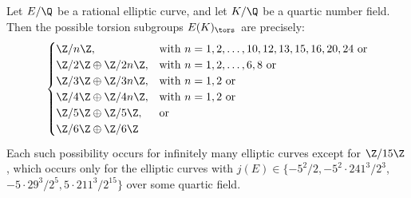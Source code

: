 \begin{frame}[plain]
\footnotesize
\begin{thm}
Let $E/\Q$ be a rational elliptic curve, and let $K/\Q$ be a quartic number field. Then the possible torsion subgroups $E(K)_\tors$ are precisely:
	\[
	\begin{cases}
	\Z/n\Z, & \text{with } n= 1, 2, \ldots, 10, 12, 13, 15, 16, 20, 24 \text{ or} \\
	\Z/2\Z \oplus \Z/2n\Z, & \text{with } n= 1, 2, \ldots, 6, 8 \text{ or} \\
	\Z/3\Z \oplus \Z/3n\Z, & \text{with } n= 1, 2 \text{ or} \\
	\Z/4\Z \oplus \Z/4n\Z, & \text{with } n= 1, 2 \text{ or} \\
	\Z/5\Z \oplus \Z/5\Z, & \text{or} \\
	\Z/6\Z \oplus \Z/6\Z 
	\end{cases}
	\]
Each such possibility occurs for infinitely many elliptic curves except for $\Z/15\Z$, which occurs only for the elliptic curves with $j(E) \in \{ -5^2/2, -5^2 \cdot 241^3/2^3$, $-5 \cdot 29^3/2^5, 5 \cdot 211^3/2^{15} \}$ over some quartic field. 
\end{thm}
	\begin{figure}[h]
	\centering
	\begin{subfigure}{0.20\textwidth}
	\captionsetup{labelformat=empty}
	\centering

\end{subfigure}
\end{figure}
\end{frame}

